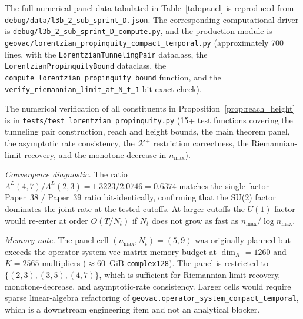 \documentclass[11pt,a4paper]{article}
\theoremstyle{plain}
\theoremstyle{definition}
\newcommand{\nmax}{n_{\max}}
\newcommand{\Nt}{N_{t}}
\newcommand{\Krein}{\mathcal{K}}
\newcommand{\Uone}{U(1)}
\newcommand{\Lprop}{\Lambda^{L}}
\newcommand{\Kplus}{\Krein^{+}}
\begin{document}
The full numerical panel data tabulated in Table~\ref{tab:panel} is
reproduced from \texttt{debug/data/l3b\_2\_sub\_sprint\_D.json}.
The corresponding computational driver is
\texttt{debug/l3b\_2\_sub\_sprint\_D\_compute.py}, and the production
module is \texttt{geovac/lorentzian\_propinquity\_compact\_temporal.py}
(approximately 700 lines, with the
\texttt{LorentzianTunnelingPair} dataclass, the
\texttt{LorentzianPropinquityBound} dataclass, the
\texttt{compute\_lorentzian\_propinquity\_bound} function, and the
\texttt{verify\_riemannian\_limit\_at\_N\_t\_1} bit-exact check).

The numerical verification of all constituents in
Proposition~\ref{prop:reach_height} is in
\texttt{tests/test\_lorentzian\_propinquity.py} (15+ test functions
covering the tunneling pair construction, reach and height bounds, the
main theorem panel, the asymptotic rate consistency, the $\Kplus$
restriction correctness, the Riemannian-limit recovery, and the monotone
decrease in $\nmax$).

\medskip\noindent\textit{Convergence diagnostic.} The ratio
$\Lprop(4, 7) / \Lprop(2, 3) = 1.3223 / 2.0746 = 0.6374$ matches the
single-factor Paper~38 / Paper~39 ratio bit-identically, confirming
that the SU(2) factor dominates the joint rate at the tested cutoffs.
At larger cutoffs the $\Uone$ factor would re-enter at order
$O(T/\Nt)$ if $\Nt$ does not grow as fast as $\nmax/\log\nmax$.

\medskip\noindent\textit{Memory note.} The panel cell $(\nmax, \Nt) =
(5, 9)$ was originally planned but exceeds the operator-system
vec-matrix memory budget at $\dim_{K} = 1260$ and $K = 2565$ multipliers
($\approx 60$~GiB \texttt{complex128}). The panel is restricted to
$\{(2,3), (3,5), (4,7)\}$, which is sufficient for Riemannian-limit
recovery, monotone-decrease, and asymptotic-rate consistency. Larger
cells would require sparse linear-algebra refactoring of
\texttt{geovac.operator\_system\_compact\_temporal}, which is a
downstream engineering item and not an analytical blocker.
\end{document}

